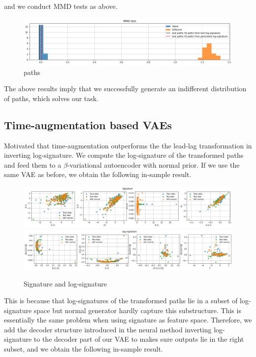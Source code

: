\documentclass[12pt]{report}
\theoremstyle{definition}
\theoremstyle{remark}
\begin{document}
and we conduct MMD tests as above. 
 \begin{figure}[H]
    \centering
    \includegraphics[width=\textwidth]{figs/cvae14.png}
    \caption{paths}
\end{figure}
The above results imply that we successfully generate an indifferent distribution of paths, which solves our task. 
\subsection{Time-augmentation based VAEs}
Motivated that time-augmentation outperforms the the lead-lag transformation in inverting log-signature. We compute the log-signature of the transformed paths and feed them to a $\beta$-variational autoencoder with normal prior. If we use the same VAE as before, we obtain the following in-sample result.
 \begin{figure}[H]
    \centering
    \includegraphics[width=\textwidth]{figs/cvae15.png}
    \includegraphics[width=\textwidth]{figs/cvae16.png}
    \caption{Signature and log-signature}
\end{figure}
This is because that log-signatures of the transformed paths lie in a subset of log-signature space but normal generator hardly capture this substructure. This is essentially the same problem when using signature as feature space. Therefore, we add the decoder structure introduced in the neural method inverting log-signature to the decoder part of our VAE to makes sure outputs lie in the right subset, and we obtain the following in-sample result.
\end{document}
